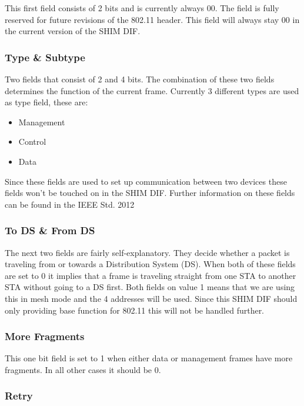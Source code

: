 This first field consists of 2 bits and is currently always 00. The field is fully reserved for future revisions of the 802.11 header. This field will always stay 00 in the current version of the SHIM DIF.

\subsubsection{Type \& Subtype}

Two fields that consist of 2 and 4 bits. The combination of these two fields determines the function of the current frame. Currently 3 different types are used as type field, these are: 
\begin{itemize}
	\item Management
	\item Control
	\item Data
\end{itemize}

Since these fields are used to set up communication between two devices these fields won't be touched on in the SHIM DIF. Further information on these fields can be found in the IEEE Std. 2012~\citep{ieee80211std}

\subsubsection{To DS \& From DS}

The next two fields are fairly self-explanatory. They decide whether a packet is traveling from or towards a Distribution System (DS). When both of these fields are set to 0 it implies that a frame is traveling straight from one STA to another STA without going to a DS first. Both fields on value 1 means that we are using this in mesh mode and the 4 addresses will be used. Since this SHIM DIF should only providing base function for 802.11 this will not be handled further.

\subsubsection{More Fragments}

This one bit field is set to 1 when either data or management frames have more fragments. In all other cases it should be 0.

\subsubsection{Retry}

